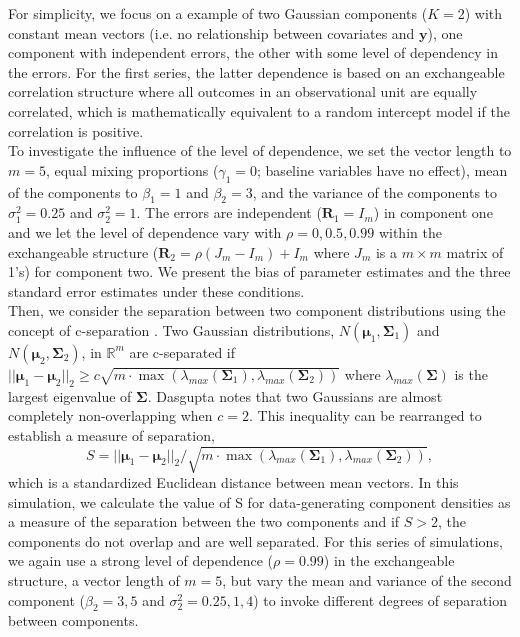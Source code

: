 \documentclass[10pt]{article}
\newcommand{\B}[0]{\mathbf}
\newcommand{\bs}[0]{\boldsymbol}
\begin{document}
 For simplicity, we focus on a example of two Gaussian components ($K = 2$) with constant mean vectors (i.e. no relationship between covariates and $\B y$), one component with independent errors, the other with some level of dependency in the errors. For the first series, the latter dependence is based on an exchangeable correlation structure where all outcomes in an observational unit are equally correlated, which is mathematically equivalent to a random intercept model if the correlation is positive.\\
 
To investigate the influence of the level of dependence, we set the vector length to $m=5$, equal mixing proportions ($\gamma_{1}=0$; baseline variables have no effect), mean of the components to $\beta_{1}=1$ and $\beta_{2}=3$, and the variance of the components to $\sigma^{2}_{1}=0.25$ and $\sigma^{2}_{2}=1$. The errors are independent ($\B R_{1}=I_{m}$) in component one and we let the level of dependence vary with $\rho=0,0.5,0.99$ within the exchangeable structure ($\B R_2 = \rho(J_m-I_m)+I_m$ where $J_m$ is a $m\times m$ matrix of 1's) for component two. We present the bias of parameter estimates and the three standard error estimates under these conditions.\\

Then, we consider the separation between two component distributions using the concept of c-separation \cite{dasgupta1999}. Two Gaussian distributions, $N(\bs\mu_{1},\bs\Sigma_{1})$ and $N(\bs\mu_{2},\bs\Sigma_{2})$, in $\mathbb{R}^{m}$ are c-separated if $||\bs\mu_{1}-\bs\mu_{2}||_{2}\geq c\sqrt{m\cdot\max(\lambda_{max}(\bs\Sigma_{1}),\lambda_{max}(\bs\Sigma_{2}))}$
where $\lambda_{max}(\bs\Sigma)$ is the largest eigenvalue of $\bs\Sigma$.  Dasgupta \cite{dasgupta1999} notes that two Gaussians are almost completely non-overlapping when $c=2$. This inequality can be rearranged to establish a measure of separation,
$$S = ||\bs\mu_{1}-\bs\mu_{2}||_{2}/\sqrt{m\cdot\max(\lambda_{max}(\bs\Sigma_{1}),\lambda_{max}(\bs\Sigma_{2}))},$$
which is a standardized Euclidean distance between mean vectors. In this simulation, we calculate the value of S for data-generating component densities as a measure of the separation between the two components and if $S>2$, the components do not overlap and are well separated. For this series of simulations, we again use a strong level of dependence ($\rho=0.99$) in the exchangeable structure, a vector length of $m=5$, but vary the mean and variance of the second component ($\beta_{2}=3,5$ and $\sigma_{2}^{2}=0.25,1,4$) to invoke different degrees of separation between components.\\
\end{document}
